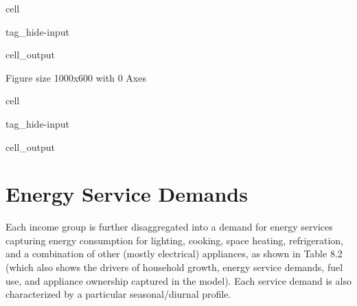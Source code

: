 \documentclass[letterpaper,10pt,english]{jupyterBook}
\begin{document}
\begin{sphinxuseclass}{cell}
\begin{sphinxuseclass}{tag_hide-input}\begin{sphinxVerbatimOutput}

\begin{sphinxuseclass}{cell_output}
\begin{sphinxVerbatim}[commandchars=\\\{\}]
\PYGZlt{}Figure size 1000x600 with 0 Axes\PYGZgt{}
\end{sphinxVerbatim}

\noindent{}

\end{sphinxuseclass}\end{sphinxVerbatimOutput}

\end{sphinxuseclass}
\end{sphinxuseclass}
\begin{sphinxuseclass}{cell}
\begin{sphinxuseclass}{tag_hide-input}\begin{sphinxVerbatimOutput}

\begin{sphinxuseclass}{cell_output}
\noindent{}

\end{sphinxuseclass}\end{sphinxVerbatimOutput}

\end{sphinxuseclass}
\end{sphinxuseclass}

\section{Energy Service Demands}
\label{\detokenize{08Residential:energy-service-demands}}
\sphinxAtStartPar
Each income group is further disaggregated into a demand for energy services capturing energy consumption for lighting, cooking, space heating, refrigeration, and a combination of other (mostly electrical) appliances, as shown in Table 8.2 (which also shows the drivers of household growth, energy service demands, fuel use, and appliance ownership captured in the model). Each service demand is also characterized by a particular seasonal/diurnal profile.
\end{document}
